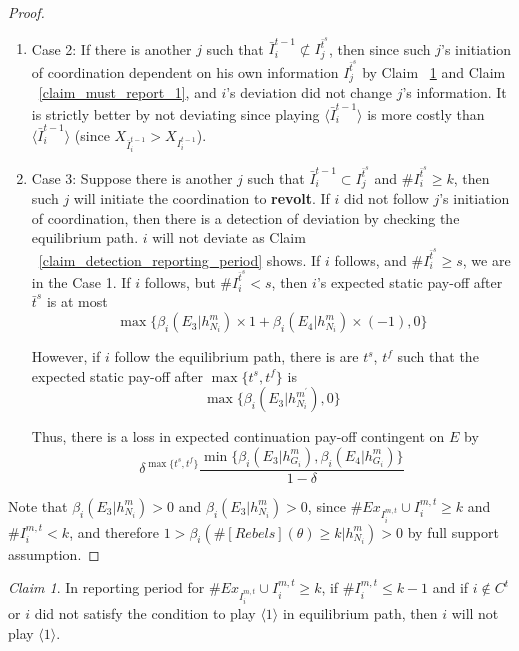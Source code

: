 \documentclass[12pt,letter]{article}
\theoremstyle{definition}
\theoremstyle{remark}
\theoremstyle{claim}
\newtheorem{claim}{Claim}
\begin{document}
\begin{proof}
\begin{enumerate}
\item Case 2: If there is another $j$ such that $\bar{I}^{t-1}_i\not\subset I^{\bar{t}^{s}}_j$, then since such $j$'s initiation of coordination dependent on his own information $I^{\bar{t}^{s}}_j$ by Claim ~\ref{claim_can_not_pretend_almost_success} and Claim ~\ref{claim_must_report_1}, and $i$'s deviation did not change $j$'s information. It is strictly better by not deviating since playing $\langle\bar{I}^{t-1}_i\rangle$ is more costly than $\langle\bar{I}^{t-1}_i\rangle$ (since $X_{\bar{I}^{t-1}_i}>X_{I^{t-1}_i}$).

\item Case 3: Suppose there is another $j$ such that $\bar{I}^{t-1}_i\subset {I}^{\bar{t}^{s}}_j$ and $\# I^{\bar{t}^s}_i\geq k$, then such $j$ will initiate  the coordination to \textbf{revolt}. If $i$ did not follow $j$'s initiation of coordination, then there is a detection of deviation by checking the equilibrium path. $i$ will not deviate as Claim ~\ref{claim_detection_reporting_period} shows. If $i$ follows, and $\#I^{\bar{t}^s}_i\geq s$, we are in the Case 1. If $i$ follows, but $\#I^{\bar{t}^s}_i< s$, then $i$'s expected static pay-off after $\bar{t}^{s}$ is at most
\[
{\max\{\beta_{i}(E_3|h^{m}_{N_i})\times 1+\beta_{i}(E_4|h^{m}_{N_i})\times (-1), 0\}}
\]

However, if $i$ follow the equilibrium path, there is are $t^s$, $t^f$ such that the expected static pay-off after $\max\{t^s,t^f\}$ is
\[\max\{\beta_{i}(E_3|h^{m^{'}}_{N_i}),0\}\]

Thus, there is a loss in expected continuation pay-off contingent on $E$ by
\[\delta^{\max\{t^s,t^f\}}\frac{\min\{\beta_{i}(E_3|h^{m}_{G_i}),\beta_{i}(E_4|h^{m}_{G_i})\}}{1-\delta}\]
\end{enumerate}

Note that $\beta_{i}(E_3|h^{m}_{N_i})>0$ and $\beta_{i}(E_3|h^{m}_{N_i})>0$, since $\#Ex_{I^{m,t}_i}\cup I^{m,t}_i\geq k$ and $\# I^{m,t}_i<k$, and therefore $1>\beta_{i}(\#[Rebels](\theta)\geq k|h^{m}_{N_i})>0$ by full support assumption.
\end{proof}



\begin{claim} 
\label{claim_can_not_pretend_almost_success}
In reporting period for $\#Ex_{I^{m,t}_i}\cup I^{m,t}_i\geq k$, if $\#I^{m,t}_i\leq k-1$ and if $i\notin C^t$ or $i$ did not satisfy the condition to play $\langle 1 \rangle$ in equilibrium path, then $i$ will not play $\langle 1 \rangle$.
\end{claim}
\end{document}
